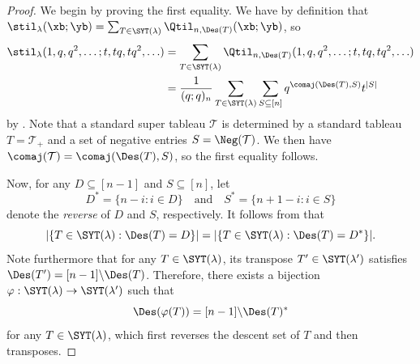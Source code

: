 \begin{proof}
    We begin by proving the first equality. We have by definition that $\stil_\lambda(\xb;\yb) = \sum_{T \in \SYT(\lambda)} \Qtil_{n,\Des(T)}(\xb;\yb)$, so
    \begin{align*}
        \stil_\lambda(1,q,q^2,\ldots;t,tq,tq^2,\ldots) &= \sum_{T \in \SYT(\lambda)} \Qtil_{n,\Des(T)}(1,q,q^2,\ldots;t,tq,tq^2,\ldots) \\
        &= \frac{1}{(q;q)_n} \sum_{T \in \SYT(\lambda)} \sum_{S \subseteq [n]} q^{\comaj(\Des(T),S)} t^{|S|}
    \end{align*}
    by . Note that a standard super tableau $\mathcal{T}$ is determined by a standard tableau $T = \mathcal{T}_+$ and a set of negative entries $S = \Neg(\mathcal{T})$. We then have $\comaj(\mathcal{T}) = \comaj(\Des(T),S)$, so the first equality follows.

    Now, for any $D \subseteq [n-1]$ and $S \subseteq [n]$, let 
    \[
    D^* = \{ n-i : i \in D \} \quad \text{and} \quad S^* = \{ n+1-i : i \in S \}
    \]
    denote the \emph{reverse} of $D$ and $S$, respectively. It follows from \cite[Prop.~7.19.2]{Stan} that
    \[
    |\{ T \in \SYT(\lambda) : \Des(T) = D \}| = |\{ T \in \SYT(\lambda) : \Des(T) = D^* \}|.
    \]
    Note furthermore that for any $T \in \SYT(\lambda)$, its transpose $T' \in \SYT(\lambda')$ satisfies $\Des(T') = [n-1] \backslash \Des(T)$. Therefore, there exists a bijection $\varphi : \SYT(\lambda) \to \SYT(\lambda')$ such that
    \[
    \Des(\varphi(T)) = [n-1] \backslash \Des(T)^*
    \]
    for any $T \in \SYT(\lambda)$, which first reverses the descent set of $T$ and then transposes. 
    

\end{proof}
